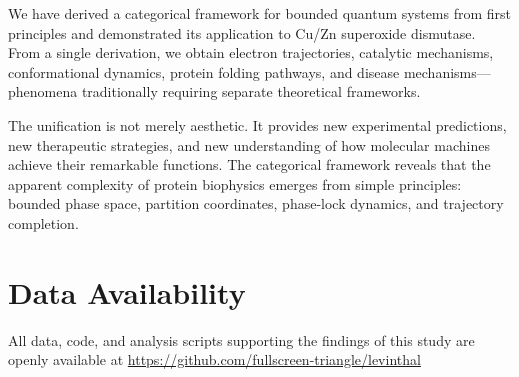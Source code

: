 \documentclass[twocolumn,aps,prx,superscriptaddress,longbibliography]{revtex4-2}
\theoremstyle{remark}
\begin{document}
We have derived a categorical framework for bounded quantum systems from
first principles and demonstrated its application to Cu/Zn superoxide
dismutase. From a single derivation, we obtain electron trajectories,
catalytic mechanisms, conformational dynamics, protein folding pathways,
and disease mechanisms---phenomena traditionally requiring separate
theoretical frameworks.

The unification is not merely aesthetic. It provides new experimental
predictions, new therapeutic strategies, and new understanding of how
molecular machines achieve their remarkable functions. The categorical
framework reveals that the apparent complexity of protein biophysics
emerges from simple principles: bounded phase space, partition coordinates,
phase-lock dynamics, and trajectory completion.

\section*{Data Availability}

All data, code, and analysis scripts supporting the findings of this study are openly available at \url{https://github.com/fullscreen-triangle/levinthal}
\end{document}
